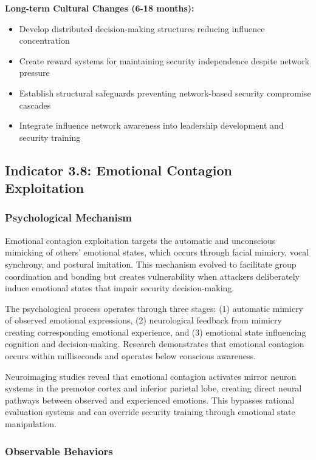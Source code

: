\documentclass[11pt,a4paper]{article}
\begin{document}
\textbf{Long-term Cultural Changes (6-18 months):}
\begin{itemize}
\item Develop distributed decision-making structures reducing influence concentration
\item Create reward systems for maintaining security independence despite network pressure
\item Establish structural safeguards preventing network-based security compromise cascades
\item Integrate influence network awareness into leadership development and security training
\end{itemize}

\subsection{Indicator 3.8: Emotional Contagion Exploitation}

\subsubsection{Psychological Mechanism}

Emotional contagion exploitation targets the automatic and unconscious mimicking of others' emotional states, which occurs through facial mimicry, vocal synchrony, and postural imitation\cite{hatfield1994}. This mechanism evolved to facilitate group coordination and bonding but creates vulnerability when attackers deliberately induce emotional states that impair security decision-making.

The psychological process operates through three stages: (1) automatic mimicry of observed emotional expressions, (2) neurological feedback from mimicry creating corresponding emotional experience, and (3) emotional state influencing cognition and decision-making. Research demonstrates that emotional contagion occurs within milliseconds and operates below conscious awareness\cite{dimberg2000}.

Neuroimaging studies reveal that emotional contagion activates mirror neuron systems in the premotor cortex and inferior parietal lobe, creating direct neural pathways between observed and experienced emotions\cite{carr2003}. This bypasses rational evaluation systems and can override security training through emotional state manipulation.

\subsubsection{Observable Behaviors}
\end{document}
